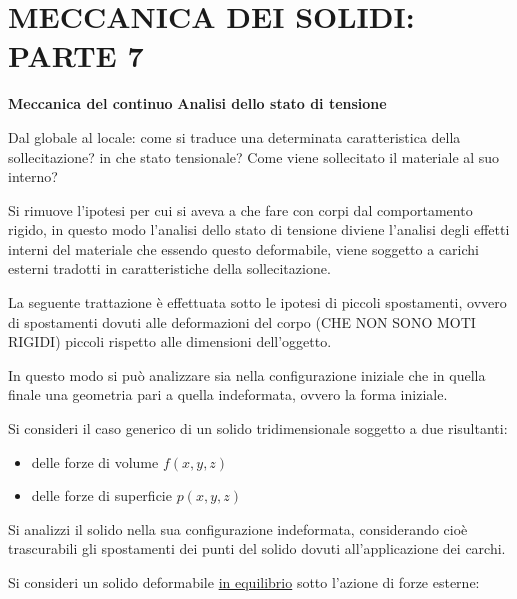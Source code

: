 \documentclass{article}
\begin{document}
	\section*{MECCANICA DEI SOLIDI: PARTE 7} %


\begin{adjustwidth}{2in}{} 
{\Large \textbf{Meccanica del continuo}} \mbox{} \newline
\textbf{Analisi dello stato di tensione} \newline

	Dal globale al locale: come si traduce una determinata caratteristica della sollecitazione? in che stato tensionale? Come viene sollecitato il materiale al suo interno? \newline 
	
	Si rimuove l'ipotesi per cui si aveva a che fare con corpi dal comportamento rigido, in questo modo l'analisi dello stato di tensione diviene l'analisi degli effetti interni del materiale che essendo questo deformabile, viene soggetto a carichi esterni tradotti in caratteristiche della sollecitazione. \newline
	
	La seguente trattazione è effettuata sotto le ipotesi di piccoli spostamenti, ovvero di spostamenti dovuti alle deformazioni del corpo (CHE NON SONO MOTI RIGIDI) piccoli rispetto alle dimensioni dell'oggetto. 
	
	In questo modo si può analizzare sia nella configurazione iniziale che in quella finale una geometria pari a quella indeformata, ovvero la forma iniziale. \newline 
	
	Si consideri il caso generico di un solido tridimensionale soggetto a due risultanti:

	\begin{itemize}
		\item  delle forze di volume $f(x,y,z)$
		\item  delle forze di superficie $p(x,y,z)$
	\end{itemize}

	Si analizzi il solido  nella sua configurazione indeformata, considerando cioè 
	trascurabili gli spostamenti dei punti del solido dovuti all’applicazione dei carchi.
	
	Si consideri un solido deformabile \underline{in equilibrio} sotto l’azione di forze esterne:
	

\end{adjustwidth}
\end{document}
